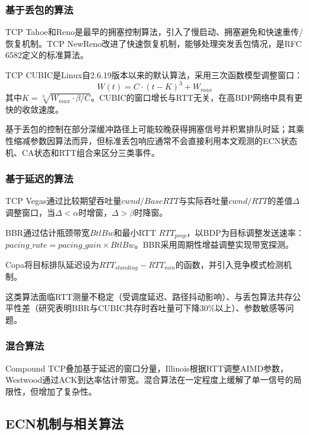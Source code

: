 \documentclass[10pt,twocolumn]{article}
\begin{document}
\subsubsection{基于丢包的算法}

TCP Tahoe和Reno是最早的拥塞控制算法\cite{jacobson1988}，引入了慢启动、拥塞避免和快速重传/恢复机制。TCP NewReno\cite{newreno}改进了快速恢复机制，能够处理突发丢包情况，是RFC 6582定义的标准算法。

TCP CUBIC\cite{cubic}是Linux自2.6.19版本以来的默认算法，采用三次函数模型调整窗口：
\begin{equation}
W(t) = C \cdot (t - K)^3 + W_{max}
\end{equation}
其中$K = \sqrt[3]{W_{max} \cdot \beta / C}$。CUBIC的窗口增长与RTT无关，在高BDP网络中具有更快的收敛速度。

基于丢包的控制在部分深缓冲路径上可能较晚获得拥塞信号并积累排队时延；其乘性缩减参数因算法而异，但标准丢包响应通常不会直接利用本文观测的ECN状态机、CA状态和RTT组合来区分三类事件。

\subsubsection{基于延迟的算法}

TCP Vegas\cite{vegas}通过比较期望吞吐量$cwnd/BaseRTT$与实际吞吐量$cwnd/RTT$的差值$\Delta$调整窗口，当$\Delta < \alpha$时增窗，$\Delta > \beta$时降窗。

BBR\cite{bbr}通过估计瓶颈带宽$BtlBw$和最小RTT $RTT_{prop}$，以BDP为目标调整发送速率：$pacing\_rate = pacing\_gain \times BtlBw$。BBR采用周期性增益调整实现带宽探测。

Copa\cite{copa}将目标排队延迟设为$RTT_{standing} - RTT_{min}$的函数，并引入竞争模式检测机制。

这类算法面临RTT测量不稳定（受调度延迟、路径抖动影响）、与丢包算法共存公平性差（研究表明BBR与CUBIC共存时吞吐量可下降30\%以上\cite{bbrfairness}）、参数敏感等问题。

\subsubsection{混合算法}

Compound TCP\cite{compound}叠加基于延迟的窗口分量，Illinois\cite{illinois}根据RTT调整AIMD参数，Westwood\cite{westwood}通过ACK到达率估计带宽。混合算法在一定程度上缓解了单一信号的局限性，但增加了复杂性。

\subsection{ECN机制与相关算法}
\end{document}

